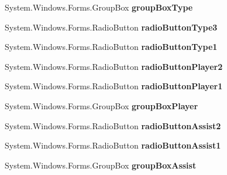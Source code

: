 \begin{DoxyCompactItemize}
System.\+Windows.\+Forms.\+Group\+Box {\bfseries group\+Box\+Type}
\item 
\mbox{\label{class_reversi_form_1_1_setting_form_ae33b6994963e9b2259de20ce48ca5261}} 
System.\+Windows.\+Forms.\+Radio\+Button {\bfseries radio\+Button\+Type3}
\item 
\mbox{\label{class_reversi_form_1_1_setting_form_a828c78e216a5e575ec0d6acde0e3068e}} 
System.\+Windows.\+Forms.\+Radio\+Button {\bfseries radio\+Button\+Type1}
\item 
\mbox{\label{class_reversi_form_1_1_setting_form_a504b357c54e884eb43b8c9920fb5b26e}} 
System.\+Windows.\+Forms.\+Radio\+Button {\bfseries radio\+Button\+Player2}
\item 
\mbox{\label{class_reversi_form_1_1_setting_form_a4d5745fc95dcf5bccb242c5f5812a166}} 
System.\+Windows.\+Forms.\+Radio\+Button {\bfseries radio\+Button\+Player1}
\item 
\mbox{\label{class_reversi_form_1_1_setting_form_a217acfb0c9ea09a2aa3a5f24309500d3}} 
System.\+Windows.\+Forms.\+Group\+Box {\bfseries group\+Box\+Player}
\item 
\mbox{\label{class_reversi_form_1_1_setting_form_ac382951e2ac78ca068d1e60833dfaeb8}} 
System.\+Windows.\+Forms.\+Radio\+Button {\bfseries radio\+Button\+Assist2}
\item 
\mbox{\label{class_reversi_form_1_1_setting_form_aeb698c86d24f588540c521f059271b46}} 
System.\+Windows.\+Forms.\+Radio\+Button {\bfseries radio\+Button\+Assist1}
\item 
\mbox{\label{class_reversi_form_1_1_setting_form_a393a96339a7224f9326ae818a751bf8f}} 
System.\+Windows.\+Forms.\+Group\+Box {\bfseries group\+Box\+Assist}
\item 
\mbox{\label{class_reversi_form_1_1_setting_form_aaf056e49fbdd49be1fba875ae8d2bd79}} 

\end{DoxyCompactItemize}
